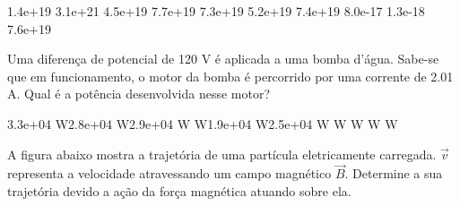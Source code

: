 \documentclass[12pt, addpoints]{exam}
\begin{document}
\begin{questions}
\begin{multicols*}{2}
\begin{oneparchoices}
\choice 1.4e+19 \choice 3.1e+21 \choice 4.5e+19 \choice 7.7e+19 \choice 7.3e+19 \choice 5.2e+19 \choice 7.4e+19 \choice 8.0e-17 \choice 1.3e-18 \choice 7.6e+19 
\end{oneparchoices}\question Uma diferença de potencial de 120 V é aplicada a uma bomba d’água. Sabe-se que em funcionamento, o motor da bomba é percorrido por uma corrente de    2.01 A. Qual é a potência desenvolvida nesse motor?

\begin{oneparchoices}
\choice 3.3e+04 W\choice 2.8e+04 W\choice 2.9e+04 W W\choice 1.9e+04 W\choice 2.5e+04 W W W W W
\end{oneparchoices}\question A ﬁgura abaixo mostra a trajetória de uma partícula eletricamente carregada. $\vec{{v}}$ representa a velocidade atravessando um campo magnético $\vec{{B}}$. Determine a sua trajetória devido a ação da força magnética atuando sobre ela.
        
        \begin{center}
            \begin{minipage}[c]{0.5\linewidth}
            \end{minipage}
        \end{center}

        


\end{multicols*}
\end{questions}
\end{document}
